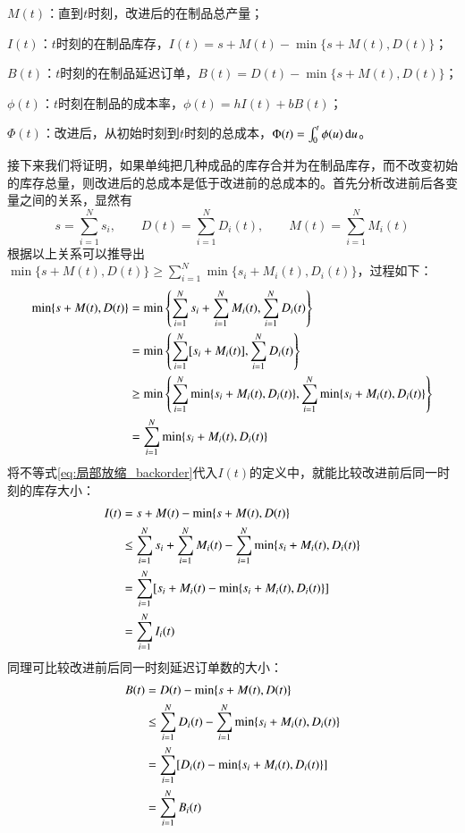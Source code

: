 $M(t)$：直到$t$时刻，改进后的在制品总产量；

$I(t)$：$t$时刻的在制品库存，$I(t)=s+M(t)-\min\{s+M(t),D(t)\}$；

$B(t)$：$t$时刻的在制品延迟订单，$B(t)=D(t)-\min\{s+M(t),D(t)\}$；

$\phi(t)$：$t$时刻在制品的成本率，$\phi(t)=hI(t)+bB(t)$；

$\Phi(t)$：改进后，从初始时刻到$t$时刻的总成本，$\Phi(t)=\int_0^t\phi(u)\operatorname{d\!} u$。

接下来我们将证明，如果单纯把几种成品的库存合并为在制品库存，而不改变初始的库存总量，则改进后的总成本是低于改进前的总成本的。首先分析改进前后各变量之间的关系，显然有
\begin{equation}
s = \sum_{i=1}^N s_i,\qquad D(t) = \sum_{i=1}^N D_i(t),\qquad M(t) = \sum_{i=1}^N M_i(t)
\label{eq:改进前后的基本关系_backorder}
\end{equation}
根据以上关系可以推导出$\min\{s+M(t),D(t)\}\geq\sum_{i=1}^N\min\{s_i+M_i(t),D_i(t)\}$，过程如下：
\begin{align}
\min\{s+M(t),D(t)\} &= \min\left\{\sum_{i=1}^N s_i+\sum_{i=1}^N M_i(t),\sum_{i=1}^N D_i(t)\right\} \notag \\
&= \min\left\{\sum_{i=1}^N [s_i+M_i(t)],\sum_{i=1}^N D_i(t)\right\} \notag \\
&\geq \min\left\{\sum_{i=1}^N\min\{s_i+M_i(t),D_i(t)\},\sum_{i=1}^N\min\{s_i+M_i(t),D_i(t)\}\right\} \notag \\
&= \sum_{i=1}^N\min\{s_i+M_i(t),D_i(t)\}
\label{eq:局部放缩_backorder}
\end{align}
将不等式\ref{eq:局部放缩_backorder}代入$I(t)$的定义中，就能比较改进前后同一时刻的库存大小：
\begin{align}
I(t) &= s+M(t)-\min\{s+M(t),D(t)\} \notag \\
&\leq \sum_{i=1}^N s_i + \sum_{i=1}^N M_i(t) - \sum_{i=1}^N\min\{s_i+M_i(t),D_i(t)\} \notag \\
&= \sum_{i=1}^N [s_i+M_i(t)-\min\{s_i+M_i(t),D_i(t)\}] \notag \\
&= \sum_{i=1}^N I_i(t)
\label{eq:改进前后同一时刻库存比较_backorder}
\end{align}
同理可比较改进前后同一时刻延迟订单数的大小：
\begin{align}
B(t) &= D(t)-\min\{s+M(t),D(t)\} \notag \\
&\leq \sum_{i=1}^N D_i(t) - \sum_{i=1}^N\min\{s_i+M_i(t),D_i(t)\} \notag \\
&= \sum_{i=1}^N [D_i(t)-\min\{s_i+M_i(t),D_i(t)\}] \notag \\
&= \sum_{i=1}^N B_i(t)
\label{eq:改进前后同一时刻backorder比较_backorder}
\end{align}
